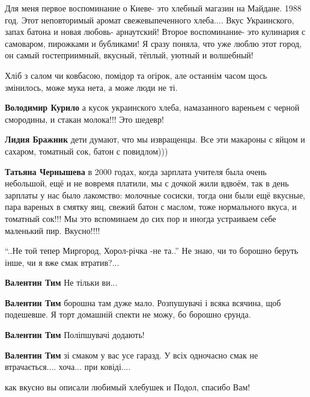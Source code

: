 \begin{itemize}

Для меня первое воспоминание о Киеве- это хлебный магазин на Майдане. 1988 год.
Этот неповторимый аромат свежевыпеченного хлеба.... Вкус Украинского, запах
батона и новая любовь- арнаутский! Второе воспоминание- это кулинария с
самоваром, пирожками и бубликами! Я сразу поняла, что уже люблю этот город, он
самый гостеприимный, вкусный, тёплый, уютный и волшебный!



Хліб з салом чи ковбасою, помідор та огірок, але останнім часом щось змінилось,
може мука нета, а може люди не ті.

\begin{itemize} %
\textbf{Володимир Курило} а кусок украинского хлеба, намазанного вареньем с черной смородины, и стакан молока!!! Это шедевр!

\textbf{Лидия Бражник} дети думают, что мы извращенцы. Все эти макароны с яйцом и сахаром, томатный сок, батон с повидлом)))

\textbf{Татьяна Чернышева} в 2000 годах, когда зарплата учителя была очень небольшой, ещё и не вовремя платили, мы с дочкой жили вдвоём, так в день зарплаты у нас было лакомство: молочные сосиски, тогда они были ещё вкусные, пара вареных в смятку яиц, свежий батон с маслом, тоже нормального вкуса, и томатный сок!!! Мы это вспоминаем до сих пор и иногда устраиваем себе маленький пир. Вкусно!!!!
\end{itemize} %


\enquote{..Не той тепер Миргород, Хорол-річка -не та..} Не знаю, чи то борошно беруть
інше, чи я вже смак втратив?...

\begin{itemize} %
\textbf{Валентин Тим} Не тільки ви...

\textbf{Валентин Тим} борошна там дуже мало. Розпушувачі і всяка всячина, щоб подешевше. Я торт домашній спекти не можу, бо борошно єрунда.

\textbf{Валентин Тим} Поліпшувачі додають!

\textbf{Валентин Тим} зі смаком у вас усе гаразд. У всіх одночасно смак не втрачається.... хоча... при ковіді....
\end{itemize} %

как вкусно вы описали любимый хлебушек и Подол, спасибо Вам!


\end{itemize}
